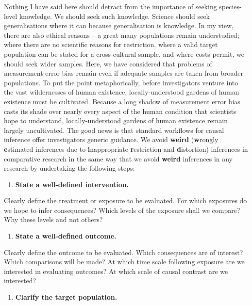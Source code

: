 \documentclass[
  single column]{article}
\providecommand{\tightlist}{%
  \setlength{\itemsep}{0pt}\setlength{\parskip}{0pt}}\usepackage{longtable,booktabs,array}
\begin{document}
Nothing I have said here should detract from the importance of seeking
species-level knowledge. We should seek such knowledge. Science should
seek generalisations where it can because generalisation is knowledge.
In my view, there are also ethical reasons -- a great many populations
remain understudied; where there are no scientific reasons for
restriction, where a valid target population can be stated for a
cross-cultural sample, and where costs permit, we should seek wider
samples. Here, we have considered that problems of measurement-error
bias remain even if adequate samples are taken from broader populations.
To put the point metaphorically, before investigators venture into the
vast wildernesses of human existence, locally-understood gardens of
human existence must be cultivated. Because a long shadow of measurement
error bias casts its shade over nearly every aspect of the human
condition that scientists hope to understand, locally-understood gardens
of human existence remain largely uncultivated. The good news is that
standard workflows for causal inference offer investigators generic
guidance. We avoid \textbf{weird} (\textbf{w}rongly \textbf{e}stimated
inferences due to \textbf{i}nappropriate \textbf{r}estriction and
\textbf{d}istortion) inferences in comparative research in the same way
that we avoid \textbf{weird} inferences in any research by undertaking
the following steps:

\begin{enumerate}
\def\labelenumi{\arabic{enumi}.}
\tightlist
\item
  \textbf{State a well-defined intervention.}
\end{enumerate}

Clearly define the treatment or exposure to be evaluated. For which
exposures do we hope to infer consequences? Which levels of the exposure
shall we compare? Why these levels and not others?

\begin{enumerate}
\def\labelenumi{\arabic{enumi}.}
\setcounter{enumi}{1}
\tightlist
\item
  \textbf{State a well-defined outcome.}
\end{enumerate}

Clearly define the outcome to be evaluated. Which consequences are of
interest? Which comparisons will be made? At which time scale following
exposure are we interested in evaluating outcomes? At which scale of
causal contrast are we interested?

\begin{enumerate}
\def\labelenumi{\arabic{enumi}.}
\setcounter{enumi}{2}
\tightlist
\item
  \textbf{Clarify the target population.}
\end{enumerate}
\end{document}
